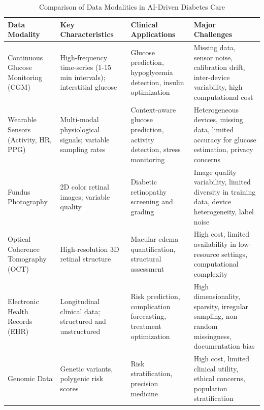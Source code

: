 \begin{table}[t]
\centering
\caption{Comparison of Data Modalities in AI-Driven Diabetes Care}
\label{tab:data_modalities}
\begin{tabular}{p{2.5cm}p{3cm}p{4cm}p{5.5cm}}
\toprule
\textbf{Data Modality} & \textbf{Key Characteristics} & \textbf{Clinical Applications} & \textbf{Major Challenges} \\
\midrule
Continuous Glucose Monitoring (CGM) & High-frequency time-series (1-15 min intervals); interstitial glucose & Glucose prediction, hypoglycemia detection, insulin optimization & Missing data, sensor noise, calibration drift, inter-device variability, high computational cost \\
\midrule
Wearable Sensors (Activity, HR, PPG) & Multi-modal physiological signals; variable sampling rates & Context-aware glucose prediction, activity detection, stress monitoring & Heterogeneous devices, missing data, limited accuracy for glucose estimation, privacy concerns \\
\midrule
Fundus Photography & 2D color retinal images; variable quality & Diabetic retinopathy screening and grading & Image quality variability, limited diversity in training data, device heterogeneity, label noise \\
\midrule
Optical Coherence Tomography (OCT) & High-resolution 3D retinal structure & Macular edema quantification, structural assessment & High cost, limited availability in low-resource settings, computational complexity \\
\midrule
Electronic Health Records (EHR) & Longitudinal clinical data; structured and unstructured & Risk prediction, complication forecasting, treatment optimization & High dimensionality, sparsity, irregular sampling, non-random missingness, documentation bias \\
\midrule
Genomic Data & Genetic variants, polygenic risk scores & Risk stratification, precision medicine & High cost, limited clinical utility, ethical concerns, population stratification \\
\bottomrule
\end{tabular}
\end{table}
